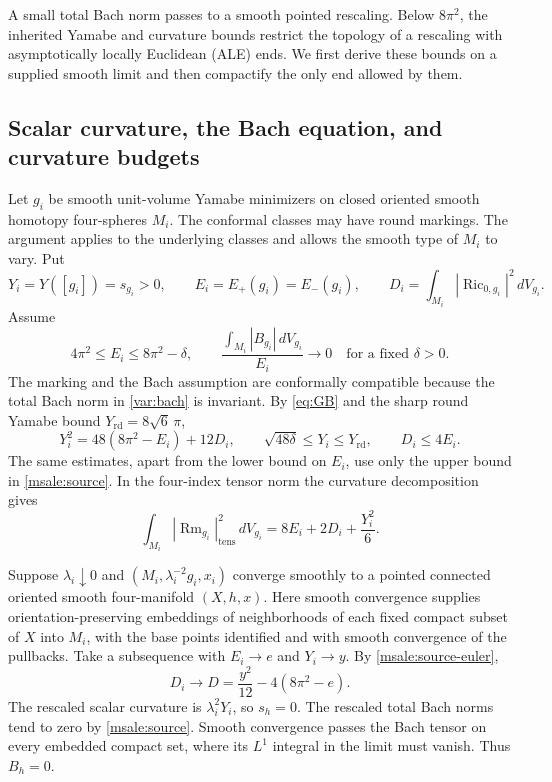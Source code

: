 \documentclass[11pt]{article}
\numberwithin{equation}{section}
\theoremstyle{definition}
\theoremstyle{remark}
\DeclareMathOperator{\Ric}{Ric}
\DeclareMathOperator{\Rm}{Rm}
\newcommand{\rd}{\mathrm{rd}}
\begin{document}
A small total Bach norm passes to a smooth pointed rescaling.
Below \(8\pi^2\), the inherited Yamabe and curvature bounds restrict
the topology of a rescaling with asymptotically locally Euclidean
(ALE) ends. We first derive these bounds on a supplied smooth limit
and then compactify the only end allowed by them.

\subsection{Scalar curvature, the Bach equation, and curvature budgets}

Let \(g_i\) be smooth unit-volume Yamabe minimizers on closed
oriented smooth homotopy four-spheres \(M_i\). The conformal classes
may have round markings. The argument applies to the underlying
classes and allows the smooth type of \(M_i\) to vary. Put
\[
 Y_i=Y([g_i])=s_{g_i}>0,\qquad
 E_i=E_+(g_i)=E_-(g_i),\qquad
 D_i=\int_{M_i}|\Ric_{0,g_i}|^2\,dV_{g_i}.
\]
Assume
\begin{equation}\label{msale:source}
 4\pi^2\le E_i\le 8\pi^2-\delta,\qquad
 \frac{\int_{M_i}|B_{g_i}|\,dV_{g_i}}{E_i}\longrightarrow0
 \quad\text{for a fixed }\delta>0.
\end{equation}
The marking and the Bach assumption are conformally compatible
because the total Bach norm in \eqref{var:bach} is invariant.
By \eqref{eq:GB} and the sharp round Yamabe bound
\(Y_{\rd}=8\sqrt6\,\pi\),
\begin{equation}\label{msale:source-euler}
 Y_i^2=48(8\pi^2-E_i)+12D_i,\qquad
 \sqrt{48\delta}\le Y_i\le Y_{\rd},\qquad
 D_i\le 4E_i .
\end{equation}
The same estimates, apart from the lower bound on \(E_i\), use
only the upper bound in \eqref{msale:source}. In the four-index
tensor norm the curvature decomposition gives
\[
 \int_{M_i}|\Rm_{g_i}|_{\mathrm{tens}}^2\,dV_{g_i}
 =8E_i+2D_i+\frac{Y_i^2}{6}.
\]

Suppose \(\lambda_i\downarrow0\) and
\((M_i,\lambda_i^{-2}g_i,x_i)\) converge smoothly to a pointed
connected oriented smooth four-manifold \((X,h,x)\). Here smooth
convergence supplies orientation-preserving embeddings of
neighborhoods of each fixed compact subset of \(X\) into \(M_i\),
with the base points identified and with smooth convergence of
the pullbacks. Take a subsequence with \(E_i\to e\) and \(Y_i\to y\).
By \eqref{msale:source-euler},
\[
 D_i\longrightarrow D=\frac{y^2}{12}-4(8\pi^2-e).
\]
The rescaled scalar curvature is \(\lambda_i^2Y_i\), so \(s_h=0\).
The rescaled total Bach norms tend to zero by \eqref{msale:source}.
Smooth convergence passes the Bach tensor on every embedded
compact set, where its \(L^1\) integral in the limit must vanish.
Thus \(B_h=0\).
\end{document}
